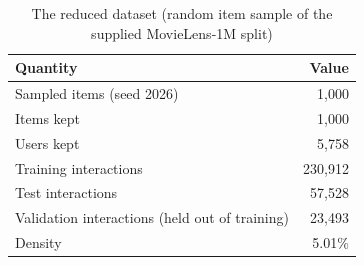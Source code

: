 \begin{table}[H]
\centering
\small
\begin{tabular}{lr}
\toprule
Quantity & Value \\
\midrule
Sampled items (seed 2026) & 1,000 \\
Items kept & 1,000 \\
Users kept & 5,758 \\
Training interactions & 230,912 \\
Test interactions & 57,528 \\
Validation interactions (held out of training) & 23,493 \\
Density & 5.01\% \\
\bottomrule
\end{tabular}
\caption{The reduced dataset (random item sample of the supplied MovieLens-1M split)}
\label{tab:dataset_summary}
\end{table}
